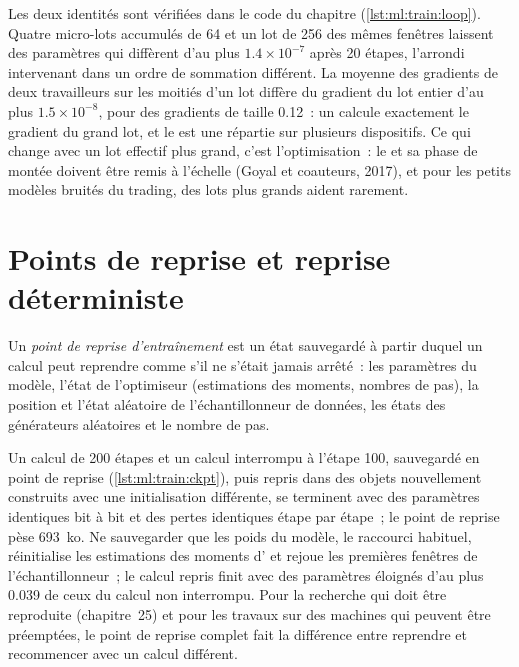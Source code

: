 Les deux identités sont vérifiées dans le code du chapitre (\cref{lst:ml:train:loop}). Quatre micro-lots accumulés de 64 et un lot
de 256 des mêmes fenêtres laissent des paramètres qui diffèrent d'au plus $1.4\times10^{-7}$ après 20 étapes, l'arrondi intervenant
dans un ordre de sommation différent. La moyenne des gradients de deux travailleurs sur les moitiés d'un lot diffère du gradient du lot
entier d'au plus $1.5\times10^{-8}$, pour des gradients de taille 0.12~: un  calcule exactement le gradient du grand lot, et le
 est une  répartie sur plusieurs dispositifs. Ce qui change avec un lot effectif plus grand,
c'est l'optimisation~: le  et sa phase de montée doivent être remis à l'échelle (Goyal et coauteurs, 2017), et pour les
petits modèles bruités du trading, des lots plus grands aident rarement.

\section{Points de reprise et reprise déterministe}

\begin{definition}\label{def:ml:training-infrastructure:ckpt}
Un \emph{point de reprise d'entraînement} est un état sauvegardé à partir duquel un calcul peut reprendre comme s'il ne s'était jamais arrêté~:
les paramètres du modèle, l'état de l'optimiseur (estimations des moments, nombres de pas), la position et l'état aléatoire de l'échantillonneur de données,
les états des générateurs aléatoires et le nombre de pas.
\end{definition}

Un calcul de 200 étapes et un calcul interrompu à l'étape 100, sauvegardé en point de reprise (\cref{lst:ml:train:ckpt}), puis repris dans des
objets nouvellement construits avec une initialisation différente, se terminent avec des paramètres identiques bit à bit et des pertes identiques
étape par étape~; le point de reprise pèse 693~ko. Ne sauvegarder que les poids du modèle, le raccourci habituel, réinitialise les estimations
des moments d' et rejoue les premières fenêtres de l'échantillonneur~; le calcul repris finit avec des paramètres éloignés d'au plus 0.039 de
ceux du calcul non interrompu. Pour la recherche qui doit être reproduite (chapitre~25) et pour les travaux sur des machines qui peuvent être
préemptées, le point de reprise complet fait la différence entre reprendre et recommencer avec un calcul différent.

